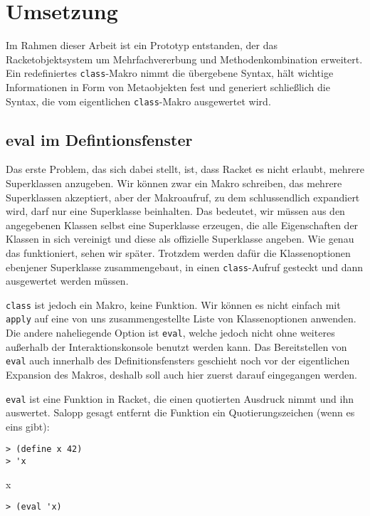 \chapter{Umsetzung}  
\label{implementation}

\vspace{-1em}
Im Rahmen dieser Arbeit ist ein Prototyp entstanden, der das Racketobjektsystem um Mehrfachvererbung und Methodenkombination erweitert. Ein redefiniertes \texttt{class}-Makro nimmt die übergebene Syntax, hält wichtige Informationen in Form von Metaobjekten fest und generiert schließlich die Syntax, die vom eigentlichen \texttt{class}-Makro ausgewertet wird.

\section{eval im Defintionsfenster}

Das erste Problem, das sich dabei stellt, ist, dass Racket es nicht erlaubt, mehrere Superklassen anzugeben. Wir können zwar ein Makro schreiben, das mehrere Superklassen akzeptiert, aber der Makroaufruf, zu dem schlussendlich expandiert wird, darf nur eine Superklasse beinhalten. Das bedeutet, wir müssen aus den angegebenen Klassen selbst eine Superklasse erzeugen, die alle Eigenschaften der Klassen in sich vereinigt und diese als offizielle Superklasse angeben. Wie genau das funktioniert, sehen wir später. Trotzdem werden dafür die Klassenoptionen ebenjener Superklasse zusammengebaut, in einen \texttt{class}-Aufruf gesteckt und dann ausgewertet werden müssen.

\texttt{class} ist jedoch ein Makro, keine Funktion. Wir können es nicht einfach mit \texttt{apply} auf eine von uns zusammengestellte Liste von Klassenoptionen anwenden. Die andere naheliegende Option ist \texttt{eval}, welche jedoch nicht ohne weiteres außerhalb der Interaktionskonsole benutzt werden kann. Das Bereitstellen von \texttt{eval} auch innerhalb des Definitionsfensters geschieht noch vor der eigentlichen Expansion des Makros, deshalb soll auch hier zuerst darauf eingegangen werden.

\texttt{eval} ist eine Funktion in Racket, die einen quotierten Ausdruck nimmt und ihn auswertet. Salopp gesagt entfernt die Funktion ein Quotierungszeichen (wenn es eins gibt):

\begin{lstlisting}
> (define x 42)
> 'x
\end{lstlisting}
{\rsymbol x}
\vspace{-1em}
\begin{lstlisting}
> (eval 'x)
\end{lstlisting}
{}

